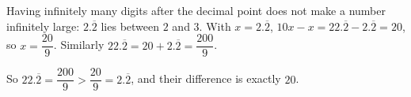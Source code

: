 Having infinitely many digits after the decimal point does not make a number infinitely large: $2.\overline2$ lies between $2$ and $3$. With $x=2.\overline2$, $10x-x=22.\overline2-2.\overline2=20$, so $x=\dfrac{20}9$. Similarly $22.\overline2=20+2.\overline2=\dfrac{200}9$.

So $\boxed{22.\overline2=\dfrac{200}{9}>\dfrac{20}9=2.\overline2}$, and their difference is exactly $20$.
